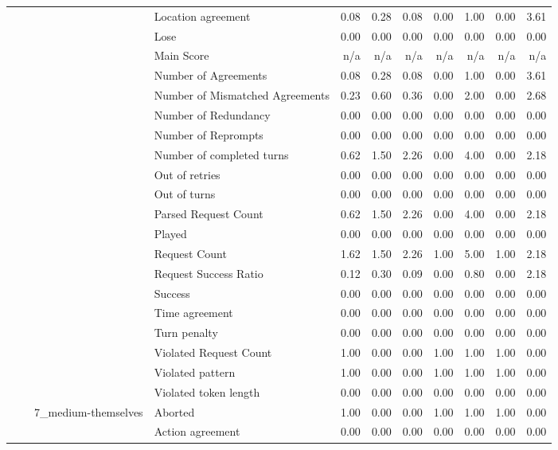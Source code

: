 \begin{tabular}{llllrrrrrrr}
 &  &  & Location agreement & 0.08 & 0.28 & 0.08 & 0.00 & 1.00 & 0.00 & 3.61 \\
 &  &  & Lose & 0.00 & 0.00 & 0.00 & 0.00 & 0.00 & 0.00 & 0.00 \\
 &  &  & Main Score & n/a & n/a & n/a & n/a & n/a & n/a & n/a \\
 &  &  & Number of Agreements & 0.08 & 0.28 & 0.08 & 0.00 & 1.00 & 0.00 & 3.61 \\
 &  &  & Number of Mismatched Agreements & 0.23 & 0.60 & 0.36 & 0.00 & 2.00 & 0.00 & 2.68 \\
 &  &  & Number of Redundancy & 0.00 & 0.00 & 0.00 & 0.00 & 0.00 & 0.00 & 0.00 \\
 &  &  & Number of Reprompts & 0.00 & 0.00 & 0.00 & 0.00 & 0.00 & 0.00 & 0.00 \\
 &  &  & Number of completed turns & 0.62 & 1.50 & 2.26 & 0.00 & 4.00 & 0.00 & 2.18 \\
 &  &  & Out of retries & 0.00 & 0.00 & 0.00 & 0.00 & 0.00 & 0.00 & 0.00 \\
 &  &  & Out of turns & 0.00 & 0.00 & 0.00 & 0.00 & 0.00 & 0.00 & 0.00 \\
 &  &  & Parsed Request Count & 0.62 & 1.50 & 2.26 & 0.00 & 4.00 & 0.00 & 2.18 \\
 &  &  & Played & 0.00 & 0.00 & 0.00 & 0.00 & 0.00 & 0.00 & 0.00 \\
 &  &  & Request Count & 1.62 & 1.50 & 2.26 & 1.00 & 5.00 & 1.00 & 2.18 \\
 &  &  & Request Success Ratio & 0.12 & 0.30 & 0.09 & 0.00 & 0.80 & 0.00 & 2.18 \\
 &  &  & Success & 0.00 & 0.00 & 0.00 & 0.00 & 0.00 & 0.00 & 0.00 \\
 &  &  & Time agreement & 0.00 & 0.00 & 0.00 & 0.00 & 0.00 & 0.00 & 0.00 \\
 &  &  & Turn penalty & 0.00 & 0.00 & 0.00 & 0.00 & 0.00 & 0.00 & 0.00 \\
 &  &  & Violated Request Count & 1.00 & 0.00 & 0.00 & 1.00 & 1.00 & 1.00 & 0.00 \\
 &  &  & Violated pattern & 1.00 & 0.00 & 0.00 & 1.00 & 1.00 & 1.00 & 0.00 \\
 &  &  & Violated token length & 0.00 & 0.00 & 0.00 & 0.00 & 0.00 & 0.00 & 0.00 \\
\cline{3-11}
 &  & \multirow[t]{27}{*}{7_medium-themselves} & Aborted & 1.00 & 0.00 & 0.00 & 1.00 & 1.00 & 1.00 & 0.00 \\
 &  &  & Action agreement & 0.00 & 0.00 & 0.00 & 0.00 & 0.00 & 0.00 & 0.00 \\

\end{tabular}
